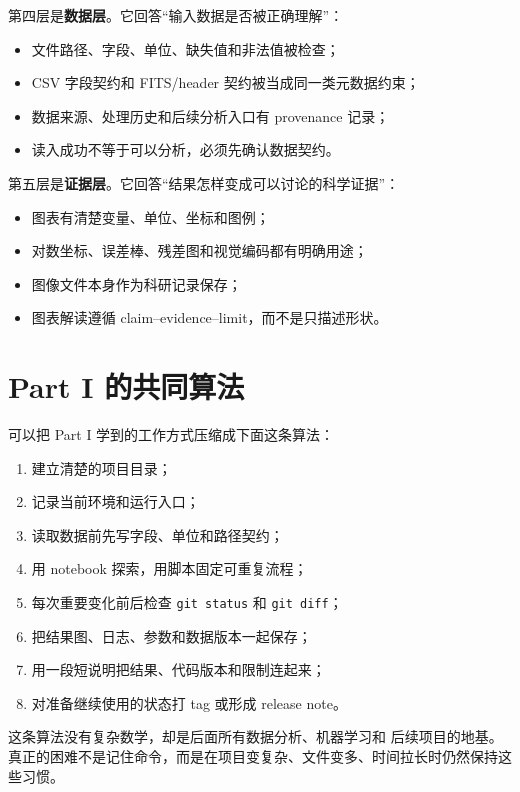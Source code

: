 第四层是\textbf{数据层}。它回答“输入数据是否被正确理解”：

\begin{itemize}
    \item 文件路径、字段、单位、缺失值和非法值被检查；
    \item CSV 字段契约和 FITS/header 契约被当成同一类元数据约束；
    \item 数据来源、处理历史和后续分析入口有 provenance 记录；
    \item 读入成功不等于可以分析，必须先确认数据契约。
\end{itemize}

第五层是\textbf{证据层}。它回答“结果怎样变成可以讨论的科学证据”：

\begin{itemize}
    \item 图表有清楚变量、单位、坐标和图例；
    \item 对数坐标、误差棒、残差图和视觉编码都有明确用途；
    \item 图像文件本身作为科研记录保存；
    \item 图表解读遵循 claim--evidence--limit，而不是只描述形状。
\end{itemize}

\section*{Part I 的共同算法}

可以把 Part I 学到的工作方式压缩成下面这条算法：

\begin{enumerate}
    \item 建立清楚的项目目录；
    \item 记录当前环境和运行入口；
    \item 读取数据前先写字段、单位和路径契约；
    \item 用 notebook 探索，用脚本固定可重复流程；
    \item 每次重要变化前后检查 \texttt{git status} 和 \texttt{git diff}；
    \item 把结果图、日志、参数和数据版本一起保存；
    \item 用一段短说明把结果、代码版本和限制连起来；
    \item 对准备继续使用的状态打 tag 或形成 release note。
\end{enumerate}

这条算法没有复杂数学，却是后面所有数据分析、机器学习和 后续项目的地基。真正的困难不是记住命令，而是在项目变复杂、文件变多、时间拉长时仍然保持这些习惯。


